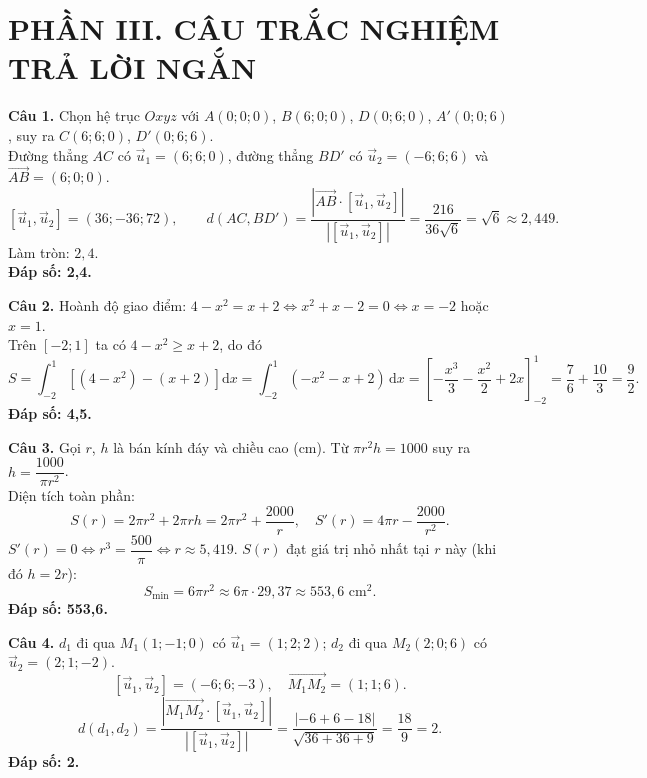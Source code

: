 \documentclass[12pt,a4paper]{article}
\begin{document}
\vspace{0.4cm}
\section*{\large PHẦN III. CÂU TRẮC NGHIỆM TRẢ LỜI NGẮN}

\noindent\textbf{Câu 1.} Chọn hệ trục $Oxyz$ với $A(0; 0; 0)$, $B(6; 0; 0)$, $D(0; 6; 0)$, $A'(0; 0; 6)$, suy ra $C(6; 6; 0)$, $D'(0; 6; 6)$.\\
Đường thẳng $AC$ có $\vec{u}_1 = (6; 6; 0)$, đường thẳng $BD'$ có $\vec{u}_2 = (-6; 6; 6)$ và $\overrightarrow{AB} = (6; 0; 0)$.
\[
[\vec{u}_1, \vec{u}_2] = (36; -36; 72), \qquad d(AC, BD') = \dfrac{|\overrightarrow{AB}\cdot[\vec{u}_1, \vec{u}_2]|}{|[\vec{u}_1, \vec{u}_2]|} = \dfrac{216}{36\sqrt{6}} = \sqrt{6} \approx 2{,}449.
\]
Làm tròn: $2{,}4$.\\
\textbf{Đáp số: 2,4.}

\vspace{0.3cm}
\noindent\textbf{Câu 2.} Hoành độ giao điểm: $4 - x^2 = x + 2 \iff x^2 + x - 2 = 0 \iff x = -2$ hoặc $x = 1$.\\
Trên $[-2; 1]$ ta có $4 - x^2 \ge x + 2$, do đó
\[
S = \int_{-2}^{1} \left[(4 - x^2) - (x + 2)\right]\mathrm{d}x = \int_{-2}^{1} (-x^2 - x + 2)\,\mathrm{d}x = \left[-\dfrac{x^3}{3} - \dfrac{x^2}{2} + 2x\right]_{-2}^{1} = \dfrac{7}{6} + \dfrac{10}{3} = \dfrac{9}{2}.
\]
\textbf{Đáp số: 4,5.}

\vspace{0.3cm}
\noindent\textbf{Câu 3.} Gọi $r$, $h$ là bán kính đáy và chiều cao ($\text{cm}$). Từ $\pi r^2 h = 1000$ suy ra $h = \dfrac{1000}{\pi r^2}$.\\
Diện tích toàn phần:
\[
S(r) = 2\pi r^2 + 2\pi r h = 2\pi r^2 + \dfrac{2000}{r}, \quad S'(r) = 4\pi r - \dfrac{2000}{r^2}.
\]
$S'(r) = 0 \iff r^3 = \dfrac{500}{\pi} \iff r \approx 5{,}419$. $S(r)$ đạt giá trị nhỏ nhất tại $r$ này (khi đó $h = 2r$):
\[
S_{\min} = 6\pi r^2 \approx 6\pi\cdot 29{,}37 \approx 553{,}6\text{ cm}^2.
\]
\textbf{Đáp số: 553,6.}

\vspace{0.3cm}
\noindent\textbf{Câu 4.} $d_1$ đi qua $M_1(1; -1; 0)$ có $\vec{u}_1 = (1; 2; 2)$; $d_2$ đi qua $M_2(2; 0; 6)$ có $\vec{u}_2 = (2; 1; -2)$.
\[
[\vec{u}_1, \vec{u}_2] = (-6; 6; -3), \quad \overrightarrow{M_1M_2} = (1; 1; 6).
\]
\[
d(d_1, d_2) = \dfrac{|\overrightarrow{M_1M_2}\cdot[\vec{u}_1, \vec{u}_2]|}{|[\vec{u}_1, \vec{u}_2]|} = \dfrac{|-6 + 6 - 18|}{\sqrt{36 + 36 + 9}} = \dfrac{18}{9} = 2.
\]
\textbf{Đáp số: 2.}
\end{document}
